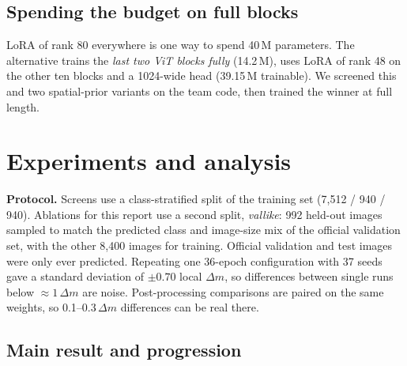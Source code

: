 \documentclass[10pt,twocolumn,letterpaper]{article}
\newcommand{\dm}{\ensuremath{\Delta m}}
\begin{document}
\subsection{Spending the budget on full blocks}
\label{sec:unfreeze}
LoRA of rank 80 everywhere is one way to spend 40\,M parameters. The alternative trains the \emph{last two ViT blocks fully} (14.2\,M), uses LoRA of rank 48 on the other ten blocks and a 1024-wide head (39.15\,M trainable). We screened this and two spatial-prior variants on the team code, then trained the winner at full length.

\section{Experiments and analysis}
\label{sec:exp}

\textbf{Protocol.} Screens use a class-stratified split of the training set (7{,}512 / 940 / 940). Ablations for this report use a second split, \emph{vallike}: 992 held-out images sampled to match the predicted class and image-size mix of the official validation set, with the other 8{,}400 images for training. Official validation and test images were only ever predicted. Repeating one 36-epoch configuration with 37 seeds gave a standard deviation of $\pm0.70$ local \dm, so differences between single runs below ${\approx}1$\,\dm{} are noise. Post-processing comparisons are paired on the same weights, so 0.1--0.3\,\dm{} differences can be real there.

\subsection{Main result and progression}
\end{document}
